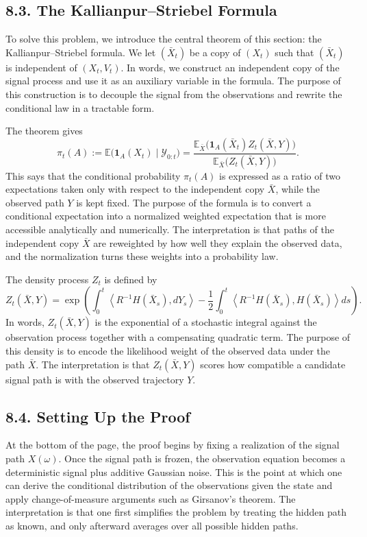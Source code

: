 \documentclass[11pt]{article}
\theoremstyle{definition}
\theoremstyle{remark}
\begin{document}
\subsection*{8.3. The Kallianpur--Striebel Formula}
To solve this problem, we introduce the central theorem of this section: the Kallianpur--Striebel formula. We let $(\bar X_t)$ be a copy of $(X_t)$ such that $(\bar X_t)$ is independent of $(X_t,V_t)$. In words, we construct an independent copy of the signal process and use it as an auxiliary variable in the formula. The purpose of this construction is to decouple the signal from the observations and rewrite the conditional law in a tractable form.

The theorem gives
\[
\pi_t(A)
:=
\mathbb E\bigl(\mathbf 1_A(X_t)\mid \mathcal Y_{0:t}\bigr)
=
\frac{\mathbb E_{\bar X}\bigl(\mathbf 1_A(\bar X_t)Z_t(\bar X,Y)\bigr)}
{\mathbb E_{\bar X}\bigl(Z_t(\bar X,Y)\bigr)}.
\]
This says that the conditional probability $\pi_t(A)$ is expressed as a ratio of two expectations taken only with respect to the independent copy $\bar X$, while the observed path $Y$ is kept fixed. The purpose of the formula is to convert a conditional expectation into a normalized weighted expectation that is more accessible analytically and numerically.
The interpretation is that paths of the independent copy $\bar X$ are reweighted by how well they explain the observed data, and the normalization turns these weights into a probability law.

The density process $Z_t$ is defined by
\[
Z_t(\bar X,Y)
=
\exp\left(
\int_0^t \left\langle R^{-1}H(\bar X_s),dY_s\right\rangle
-\frac12\int_0^t \left\langle R^{-1}H(\bar X_s),H(\bar X_s)\right\rangle ds
\right).
\]
In words, $Z_t(\bar X,Y)$ is the exponential of a stochastic integral against the observation process together with a compensating quadratic term. The purpose of this density is to encode the likelihood weight of the observed data under the path $\bar X$.
The interpretation is that $Z_t(\bar X,Y)$ scores how compatible a candidate signal path is with the observed trajectory $Y$.

\subsection*{8.4. Setting Up the Proof}
At the bottom of the page, the proof begins by fixing a realization of the signal path $X(\omega)$. Once the signal path is frozen, the observation equation becomes a deterministic signal plus additive Gaussian noise. This is the point at which one can derive the conditional distribution of the observations given the state and apply change-of-measure arguments such as Girsanov's theorem.
The interpretation is that one first simplifies the problem by treating the hidden path as known, and only afterward averages over all possible hidden paths.
\end{document}

